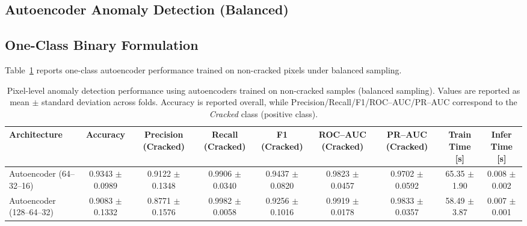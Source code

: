 \clearpage
\begin{landscape}
\section{Autoencoder Anomaly Detection (Balanced)}
\label{app:autoencoder_balanced}

\subsection{One-Class Binary Formulation}

\noindent
Table~\ref{tab:autoencoder_pixel_results_balanced} reports one-class autoencoder performance trained on non-cracked pixels under balanced sampling.


\thispagestyle{plain}

\begin{table}[!htbp]
    \centering
    \caption[Autoencoder anomaly detection: non-cracked balanced (full CV)]{Pixel-level anomaly detection performance using autoencoders trained on non-cracked samples (balanced sampling).
    Values are reported as mean $\pm$ standard deviation across folds.
    Accuracy is reported overall, while Precision/Recall/F1/ROC--AUC/PR--AUC correspond to the \textit{Cracked} class (positive class).}
    \label{tab:autoencoder_pixel_results_balanced}
    \small
    \renewcommand{\arraystretch}{1.25}
    \setlength{\tabcolsep}{7pt}
    \begin{adjustbox}{max width=\linewidth,center}
    \begin{tabular}{@{}lcccccccc@{}}
        \toprule
        Architecture &
        Accuracy &
        Precision (Cracked) &
        Recall (Cracked) &
        F1 (Cracked) &
        ROC--AUC (Cracked) &
        PR--AUC (Cracked) &
        Train Time [s] &
        Infer Time [s] \\
        \midrule

        Autoencoder (64--32--16)
        & 0.9343 $\pm$ 0.0989
        & 0.9122 $\pm$ 0.1348
        & 0.9906 $\pm$ 0.0340
        & 0.9437 $\pm$ 0.0820
        & 0.9823 $\pm$ 0.0457
        & 0.9702 $\pm$ 0.0592
        & 65.35 $\pm$ 1.90
        & 0.008 $\pm$ 0.002 \\

        Autoencoder (128--64--32)
        & 0.9083 $\pm$ 0.1332
        & 0.8771 $\pm$ 0.1576
        & 0.9982 $\pm$ 0.0058
        & 0.9256 $\pm$ 0.1016
        & 0.9919 $\pm$ 0.0178
        & 0.9833 $\pm$ 0.0357
        & 58.49 $\pm$ 3.87
        & 0.007 $\pm$ 0.001 \\


\end{tabular}
\end{adjustbox}
\end{table}
\end{landscape}
